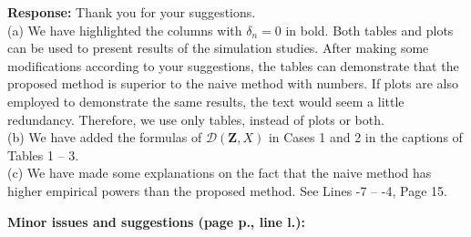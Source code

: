 \documentclass[12pt]{report}
\begin{document}
\begin{description}
{ \bf Response: } Thank you for your suggestions.\\

(a) We have highlighted the columns with $\delta_n=0$ in bold. Both tables and plots can be used to present results of the simulation studies. After making  some modifications according to your suggestions, the tables can demonstrate that the proposed method is superior to the naive method with numbers.  If   plots are also employed to demonstrate the same results,
the text would seem a little redundancy. Therefore, we use only tables, instead of plots or both.\\

(b) We have added the formulas of $\mathcal{D}(\mathbf{Z},X)$ in Cases 1 and 2  in the  captions of Tables 1 -- 3.\\

(c) We have made some explanations on the fact that the naive method has higher empirical powers than the proposed method. See Lines -7 -- -4, Page 15. \\


\end{description}


\vspace*{0.1in}

{\bf Minor issues and suggestions (page p., line l.):}

\vspace*{0.1in}
\end{document}
